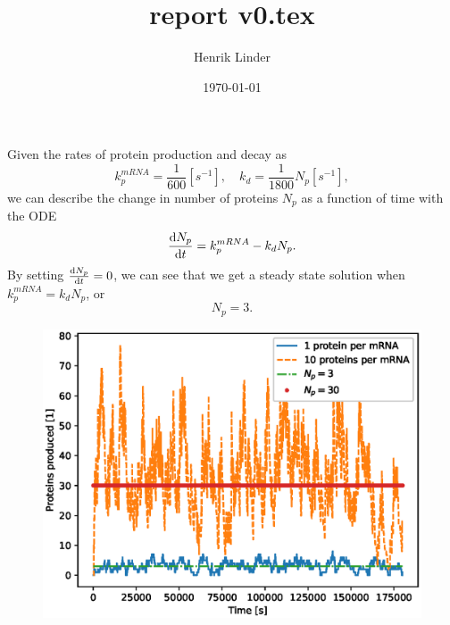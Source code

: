 \documentclass{article}
\title{report v0.tex }
\author{Henrik Linder}
\date{\today}
\begin{document}
\maketitle

Given the rates of protein production and decay as 
\begin{equation}
	k_p^{mRNA} = \frac{1}{600}[s^{-1}],\quad k_d = \frac{1}{1800}N_p[s^{-1}],
\end{equation}
we can describe the change in number of proteins $N_p$ as a function of time with the ODE 
\begin{equation}
	\label{eq:protein_ODE}
	\dv {N_p}{t} = k_p^{mRNA}  - k_dN_p .
\end{equation}
By setting $\dv {N_p}{t} = 0 $, we can see that we get a steady state solution when $k_p^{mRNA} = k_dN_p$, or 
\begin{equation}
	\label{eq:steady_state}
	N_p = 3.
\end{equation}


\begin{figure}[H]
	\centering
\includegraphics[width = \linewidth]{figs/task1_results_v3.eps}
	\label{fig:task1_results}
\end{figure}
\end{document}
